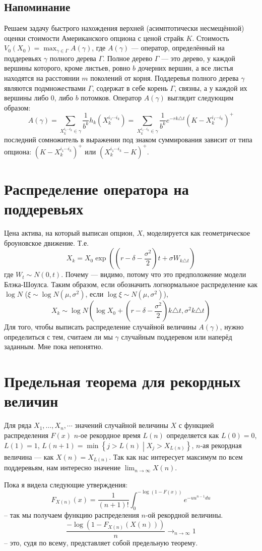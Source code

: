 \documentclass{article}
\newcommand{\deltat}{\triangle t}
\begin{document}
	\subsection{Напоминание} %
	\label{sub:reminder}
	Решаем задачу быстрого нахождения верхней (асимптотически несмещённой) оценки стоимости Американского опциона с ценой страйк $K$. Стоимость $V_0 \left(X_0\right) = \max_{\gamma\in\Gamma} A(\gamma)$, где $A(\gamma)$ --- оператор, определённый на поддеревьях $\gamma$ полного дерева $\Gamma$. Полное дерево $\Gamma$ --- это дерево, у каждой вершины которого, кроме листьев, ровно $b$ дочерних вершин, а все листья находятся на расстоянии $m$ поколений от корня. Поддеревья полного дерева $\gamma$ являются подмножествами $\Gamma$, содержат в себе корень $\Gamma$, связны, а у каждой их вершины либо 0, либо $b$ потомков. Оператор $A\left(\gamma\right)$ выглядит следующим образом:
	$$A\left(\gamma\right) = 
		\sum_{X_k^{i_1\cdots i_k}\in\gamma} \frac{1}{b^k}h_k\left(X_k^{i_1\cdots i_k}\right) = 
		\sum_{X_k^{i_1\cdots i_k}\in\gamma} \frac{1}{b^k}e^{-rk\deltat}\left(K - X_k^{i_1\cdots i_k}\right)^+$$
	последний сомножитель в выражении под знаком суммирования зависит от типа опциона: $\left(K - X_k^{i_1\cdots i_k}\right)^+$ или $\left(X_k^{i_1\cdots i_k} - K\right)^+$.
	\section{Распределение оператора на поддеревьях}
	Цена актива, на который выписан опцион, $X$, моделируется как геометрическое броуновское движение. Т.е.
	$$X_{k} = X_0 \exp\left(\left(r - \delta - \frac{\sigma^2}{2}\right)t + \sigma W_{k\deltat}\right)$$
	где $W_t \sim N\left(0, t\right)$. Почему --- видимо, потому что это предположение модели Блэка-Шоулса. Таким образом, если обозначить логнормальное распределение как $\log N$ ($\xi\sim\log N\left(\mu, \sigma^2\right)$, если $\log\xi\sim N\left(\mu, \sigma^2\right)$),
	$$X_k \sim \log N\left( \log X_0 + \left(r - \delta - \frac{\sigma^2}{2}\right)k\deltat, \sigma^2 k\deltat\right)$$
	Для того, чтобы выписать распределение случайной величины $A(\gamma)$, нужно определиться с тем, считаем ли мы $\gamma$ случайным поддеревом или наперёд заданным. Мне пока непонятно.
	\section{Предельная теорема для рекордных величин}
	Для ряда $X_1, \ldots, X_n, \cdots$ значений случайной величины $X$ с функцией распределения $F(x)$ $n$-ое рекордное время $L(n)$ определяется как $L(0) = 0$, $L(1) = 1$, $L(n+1) = \min\left\lbrace j > L(n) \middle\vert X_j > X_{L(n)} \right\rbrace$, $n$-ая рекордная величина --- как $X(n) = X_{L(n)}$. Так как нас интересует максимум по всем поддеревьям, нам интересно значение $\lim_{n\to\infty}X(n)$.

	Пока я видела следующие утверждения:
	$$F_{X(n)}(x) = \frac{1}{(n+1)!}\int_0^{-\log(1-F(x))} e^{-u u^{n-1} du}$$
	-- так мы получаем функцию распределения $n$-ой рекордной величины.
	$$\frac{-\log(1 - F_{X(n)}(X(n)))}{n} \rightarrow_{n\to\infty} 1$$
	-- это, судя по всему, представляет собой предельную теорему.
\end{document}
